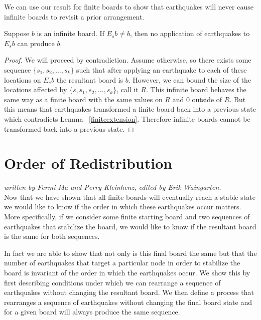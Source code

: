 \documentclass[runningheads,a4paper]{llncs}
\begin{document}
We can use our result for finite boards to show that earthquakes will never cause infinite boards to revisit a prior arrangement.  

\begin{corollary}
Suppose $b$ is an infinite board. If $E_s b \neq b$, then no application of earthquakes to $E_s b$ can produce $b$.
\end{corollary}

\begin{proof}
We will proceed by contradiction. Assume otherwise, so there exists some sequence $\{s_1, s_2, \ldots, s_k\}$ such that after applying an earthquake to each of these locations on $E_s b$ the resultant board is $b$.
However, we can bound the size of the locations affected by $\{s, s_1, s_2, \ldots, s_k \}$, call it $R$.  This infinite board behaves the same way as a finite board with the same values on $R$ and 0 outside of $R$. But this means that earthquakes transformed a finite board back into a previous state which contradicts Lemma ~\ref{finiteextension}. Therefore infinite boards cannot be transformed back into a previous state.
\end{proof}

\section{Order of Redistribution}
\label{Order of Redistribution}

\emph{written by Fermi Ma and Perry Kleinhenz, edited by Erik Waingarten.}\\

Now that we have shown that all finite boards will eventually reach a stable state we would like to know if the order in which these earthquakes occur matters. More specifically, if we consider some finite starting board and two sequences of earthquakes that stabilize the board, we would like to know if the resultant board is the same for both sequences. 

In fact we are able to show that not only is this final board the same but that the number of earthquakes that target a particular node in order to stabilize the board is invariant of the order in which the earthquakes occur. We show this by first describing conditions under which we can rearrange a sequence of earthquakes without changing the resultant board. We then define a process that rearranges a sequence of earthquakes without changing the final board state and for a given board will always produce the same sequence.\\
\end{document}
